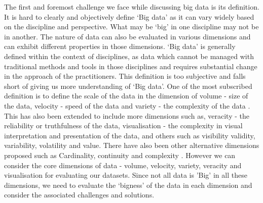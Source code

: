 The first and foremost challenge we face while discussing big data is its definition.
It is hard to clearly and objectively define `Big data' as it can vary widely based on the discipline and perspective.
What may be `big' in one discipline may not be in another.
The nature of data can also be evaluated in various dimensions and can exhibit different properties in those dimensions. 
`Big data' is generally defined within the context of disciplines, as data which cannot be managed with traditional methods and tools in those disciplines and requires substantial change in the approach of the practitioners.
This definition is too subjective and falls short of giving us more understanding of `Big data'.
One of the most subscribed definition is to define the scale of the data in the dimension of volume - size of the data, velocity - speed of the data and variety  - the complexity of the data \cite{laney20013d}.
This has also been extended to include more dimensions such as, veracity - the reliability or truthfulness of the data, visualisation - the complexity in visual interpretation and presentation of the data, and others such as visibility validity, variability, volatility and value.
There have also been other alternative dimensions proposed such as Cardinality, continuity and complexity \cite{suthaharan2014big}.
However we can consider the core dimensions of data - volume, velocity, variety, veracity and visualisation for evaluating our datasets.
Since not all data is 'Big' in all these dimensions, we need to evaluate the `bigness' of the data in each dimension and consider the associated challenges and solutions.


